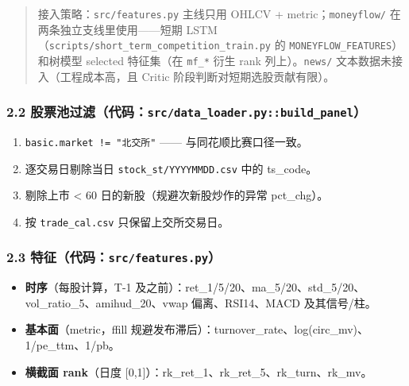 \documentclass[
  fontset=fandol]{ctexart}
\providecommand{\tightlist}{%
  \setlength{\itemsep}{0pt}\setlength{\parskip}{0pt}}
\begin{document}
\begin{quote}
接入策略：\texttt{src/features.py}
主线只用 OHLCV +
metric；\texttt{moneyflow/}
在两条独立支线里使用------短期
LSTM（\texttt{scripts/short\_term\_competition\_train.py}
的
\texttt{MONEYFLOW\_FEATURES}）和树模型
selected 特征集（在 \texttt{mf\_*} 衍生
rank 列上）。\texttt{news/}
文本数据未接入（工程成本高，且 Critic
阶段判断对短期选股贡献有限）。
\end{quote}

\hypertarget{ux80a1ux7968ux6c60ux8fc7ux6ee4ux4ee3ux7801srcdata_loader.pybuild_panel}{%
\subsubsection{\texorpdfstring{2.2
股票池过滤（代码：\texttt{src/data\_loader.py::build\_panel}）}{2.2 股票池过滤（代码：src/data\_loader.py::build\_panel）}}\label{ux80a1ux7968ux6c60ux8fc7ux6ee4ux4ee3ux7801srcdata_loader.pybuild_panel}}

\begin{enumerate}
\def\labelenumi{\arabic{enumi}.}
\tightlist
\item
  \texttt{basic.market\ !=\ "北交所"}
  ------ 与同花顺比赛口径一致。
\item
  逐交易日剔除当日
  \texttt{stock\_st/YYYYMMDD.csv} 中的
  ts\_code。
\item
  剔除上市 \textless{} 60
  日的新股（规避次新股炒作的异常
  pct\_chg）。
\item
  按 \texttt{trade\_cal.csv}
  只保留上交所交易日。
\end{enumerate}

\hypertarget{ux7279ux5f81ux4ee3ux7801srcfeatures.py}{%
\subsubsection{\texorpdfstring{2.3
特征（代码：\texttt{src/features.py}）}{2.3 特征（代码：src/features.py）}}\label{ux7279ux5f81ux4ee3ux7801srcfeatures.py}}

\begin{itemize}
\tightlist
\item
  \textbf{时序}（每股计算，T-1
  及之前）：ret\_1/5/20、ma\_5/20、std\_5/20、vol\_ratio\_5、amihud\_20、vwap
  偏离、RSI14、MACD 及其信号/柱。
\item
  \textbf{基本面}（metric，ffill
  规避发布滞后）：turnover\_rate、log(circ\_mv)、1/pe\_ttm、1/pb。
\item
  \textbf{横截面 rank}（日度
  {[}0,1{]}）：rk\_ret\_1、rk\_ret\_5、rk\_turn、rk\_mv。
\end{itemize}
\end{document}
